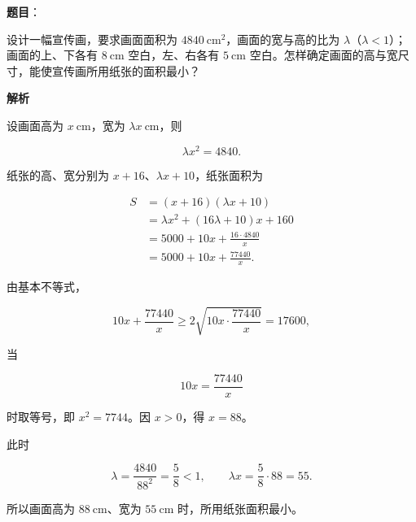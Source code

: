 \begin{answer}

\textbf{题目}：

设计一幅宣传画，要求画面面积为 $4840\ \mathrm{cm}^2$，画面的宽与高的比为 $\lambda$（$\lambda<1$）；画面的上、下各有 $8\ \mathrm{cm}$ 空白，左、右各有 $5\ \mathrm{cm}$ 空白。怎样确定画面的高与宽尺寸，能使宣传画所用纸张的面积最小？

\textbf{解析}

设画面高为 $x\ \mathrm{cm}$，宽为 $\lambda x\ \mathrm{cm}$，则

\nopagebreak[4]
\[
\lambda x^2=4840.
\]

纸张的高、宽分别为 $x+16$、$\lambda x+10$，纸张面积为

\nopagebreak[4]
\[
\begin{aligned}
S
&=(x+16)(\lambda x+10)\\
&=\lambda x^2+(16\lambda+10)x+160\\
&=5000+10x+\frac{16\cdot4840}{x}\\
&=5000+10x+\frac{77440}{x}.
\end{aligned}
\]

由基本不等式，

\nopagebreak[4]
\[
10x+\frac{77440}{x}\ge2\sqrt{10x\cdot\frac{77440}{x}}
=17600,
\]

当

\nopagebreak[4]
\[
10x=\frac{77440}{x}
\]

时取等号，即 $x^2=7744$。因 $x>0$，得 $x=88$。

此时

\nopagebreak[4]
\[
\lambda=\frac{4840}{88^2}=\frac58<1,\qquad
\lambda x=\frac58\cdot88=55.
\]

所以画面高为 $88\ \mathrm{cm}$、宽为 $55\ \mathrm{cm}$ 时，所用纸张面积最小。


\end{answer}
